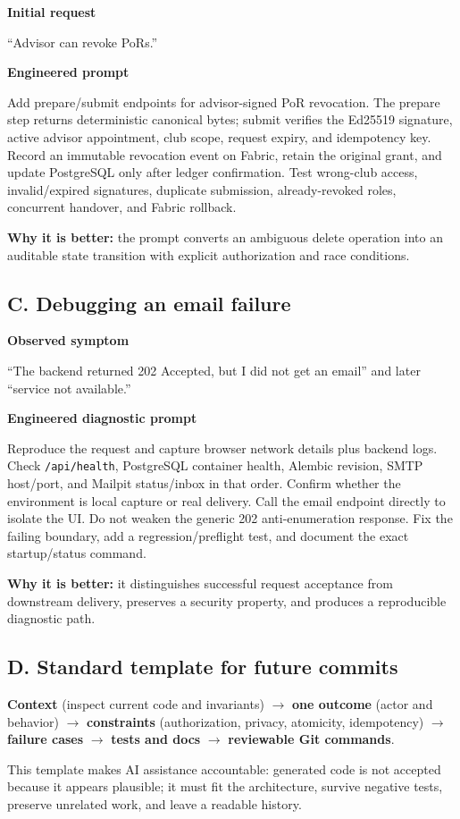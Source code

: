 \documentclass[10pt,a4paper]{article}
\newcommand{\callout}[1]{%
  \vspace{2pt}\noindent
  \colorbox{soft}{\parbox{0.965\linewidth}{\small #1}}\vspace{2pt}}
\begin{document}
\textbf{Initial request}\par
\callout{``Advisor can revoke PoRs.''}

\textbf{Engineered prompt}\par
\callout{Add prepare/submit endpoints for advisor-signed PoR revocation. The prepare step returns deterministic canonical bytes; submit verifies the Ed25519 signature, active advisor appointment, club scope, request expiry, and idempotency key. Record an immutable revocation event on Fabric, retain the original grant, and update PostgreSQL only after ledger confirmation. Test wrong-club access, invalid/expired signatures, duplicate submission, already-revoked roles, concurrent handover, and Fabric rollback.}

\textbf{Why it is better:} the prompt converts an ambiguous delete operation into an auditable state transition with explicit authorization and race conditions.

\subsection{C. Debugging an email failure}

\textbf{Observed symptom}\par
\callout{``The backend returned 202 Accepted, but I did not get an email'' and later ``service not available.''}

\textbf{Engineered diagnostic prompt}\par
\callout{Reproduce the request and capture browser network details plus backend logs. Check \texttt{/api/health}, PostgreSQL container health, Alembic revision, SMTP host/port, and Mailpit status/inbox in that order. Confirm whether the environment is local capture or real delivery. Call the email endpoint directly to isolate the UI. Do not weaken the generic 202 anti-enumeration response. Fix the failing boundary, add a regression/preflight test, and document the exact startup/status command.}

\textbf{Why it is better:} it distinguishes successful request acceptance from downstream delivery, preserves a security property, and produces a reproducible diagnostic path.

\subsection{D. Standard template for future commits}

\callout{\textbf{Context} (inspect current code and invariants) $\rightarrow$ \textbf{one outcome} (actor and behavior) $\rightarrow$ \textbf{constraints} (authorization, privacy, atomicity, idempotency) $\rightarrow$ \textbf{failure cases} $\rightarrow$ \textbf{tests and docs} $\rightarrow$ \textbf{reviewable Git commands}.}

This template makes AI assistance accountable: generated code is not accepted because it appears plausible; it must fit the architecture, survive negative tests, preserve unrelated work, and leave a readable history.
\end{document}
